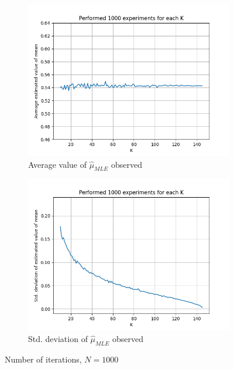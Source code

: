 \documentclass[fleqn, 11pt]{article}
\begin{document}
\newpage
\begin{figure}[H]
    \centering
    \begin{subfigure}[H]{0.49\textwidth}
        \centering
        \includegraphics[width=\textwidth]{P1/mu/avgs_1000.png}
        \caption[]{Average value of $\hat{\mu}_{MLE}$ observed}
    \end{subfigure}
    \begin{subfigure}[H]{0.49\textwidth}
        \centering
        \includegraphics[width=\textwidth]{P1/mu/stds_1000.png}
        \caption[]{Std. deviation of $\hat{\mu}_{MLE}$ observed}
    \end{subfigure}
    \caption{Number of iterations, $N = 1000$}
\end{figure}
\vspace{30pt}
\end{document}
